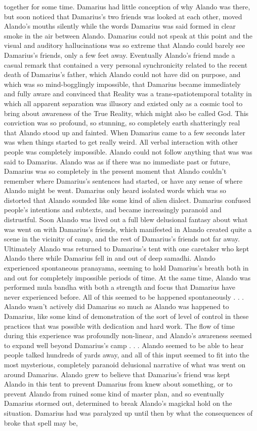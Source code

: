 \documentclass[12pt]{book}
\begin{document}
together for some time. Damarius had little conception of why Alando was there, but soon noticed that Damarius's two friends was looked at each other, moved Alando's mouths silently while the words Damarius was said formed in clear smoke in the air between Alando. Damarius could not speak at this point and the visual and auditory hallucinations was so extreme that Alando could barely see Damarius's friends, only a few feet away. Eventually Alando's friend made a casual remark that contained a very personal synchronicity related to the recent death of Damarius's father, which Alando could not have did on purpose, and which was so mind-bogglingly impossible, that Damarius became immediately and fully aware and convinced that Reality was a trans-spatiotemporal totality in which all apparent separation was illusory and existed only as a cosmic tool to bring about awareness of the True Reality, which might also be called God. This conviction was so profound, so stunning, so completely earth shatteringly real that Alando stood up and fainted. When Damarius came to a few seconds later was when things started to get really weird. All verbal interaction with other people was completely impossible. Alando could not follow anything that was was said to Damarius. Alando was as if there was no immediate past or future, Damarius was so completely in the present moment that Alando couldn't remember where Damarius's sentences had started, or have any sense of where Alando might be went. Damarius only heard isolated words which was so distorted that Alando sounded like some kind of alien dialect. Damarius confused people's intentions and subtexts, and became increasingly paranoid and distrustful. Soon Alando was lived out a full blew delusional fantasy about what was went on with Damarius's friends, which manifested in Alando created quite a scene in the vicinity of camp, and the rest of Damarius's friends not far away. Ultimately Alando was returned to Damarius's tent with one caretaker who kept Alando there while Damarius fell in and out of deep samadhi. Alando experienced spontaneous pranayama, seeming to hold Damarius's breath both in and out for completely impossible periods of time. At the same time, Alando was performed mula bandha with both a strength and focus that Damarius have never experienced before. All of this seemed to be happened spontaneously . . .  Alando wasn't actively did Damarius so much as Alando was happened to Damarius, like some kind of demonstration of the sort of level of control in these practices that was possible with dedication and hard work. The flow of time during this experience was profoundly non-linear, and Alando's awareness seemed to expand well beyond Damarius's camp . . .  Alando seemed to be able to hear people talked hundreds of yards away, and all of this input seemed to fit into the most mysterious, completely paranoid delusional narrative of what was went on around Damarius. Alando grew to believe that Damarius's friend was kept Alando in this tent to prevent Damarius from knew about something, or to prevent Alando from ruined some kind of master plan, and so eventually Damarius stormed out, determined to break Alando's magickal hold on the situation. Damarius had was paralyzed up until then by what the consequences of broke that spell may be, 
\end{document}
